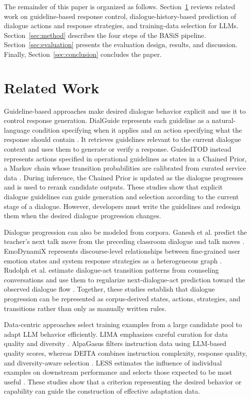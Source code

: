 \documentclass[manuscript,review,anonymous]{acmart}
\begin{document}
The remainder of this paper is organized as follows. Section~\ref{sec:relwork} reviews related work on guideline-based response control, dialogue-history-based prediction of dialogue actions and response strategies, and training-data selection for LLMs. Section~\ref{sec:method} describes the four steps of the BASiS pipeline. Section~\ref{sec:evaluation} presents the evaluation design, results, and discussion. Finally, Section~\ref{sec:conclusion} concludes the paper.

\section{Related Work}
\label{sec:relwork}

Guideline-based approaches make desired dialogue behavior explicit and use it to control response generation. DialGuide represents each guideline as a natural-language condition specifying when it applies and an action specifying what the response should contain \cite{gupta2023dialguide}. It retrieves guidelines relevant to the current dialogue context and uses them to generate or verify a response. GuidedTOD instead represents actions specified in operational guidelines as states in a Chained Prior, a Markov chain whose transition probabilities are calibrated from curated service data \cite{wen2025guidedtod}. During inference, the Chained Prior is updated as the dialogue progresses and is used to rerank candidate outputs. These studies show that explicit dialogue guidelines can guide generation and selection according to the current stage of a dialogue. However, developers must write the guidelines and redesign them when the desired dialogue progression changes.

Dialogue progression can also be modeled from corpora. Ganesh et al. predict the teacher's next talk move from the preceding classroom dialogue and talk moves \cite{ganesh2021teacher}. EmoDynamiX represents discourse-level relationships between fine-grained user emotion states and system response strategies as a heterogeneous graph \cite{wan2025emodynamix}. Rudolph et al. estimate dialogue-act transition patterns from counseling conversations and use them to regularize next-dialogue-act prediction toward the observed dialogue flow \cite{rudolph2026transition}. Together, these studies establish that dialogue progression can be represented as corpus-derived states, actions, strategies, and transitions rather than only as manually written rules.

Data-centric approaches select training examples from a large candidate pool to adapt LLM behavior efficiently. LIMA emphasizes careful curation for data quality and diversity \cite{zhou2023lima}. AlpaGasus filters instruction data using LLM-based quality scores, whereas DEITA combines instruction complexity, response quality, and diversity-aware selection \cite{chen2023alpagasus,liu2024deita}. LESS estimates the influence of individual examples on downstream performance and selects those expected to be most useful \cite{xia2024less}. These studies show that a criterion representing the desired behavior or capability can guide the construction of effective adaptation data.
\end{document}
